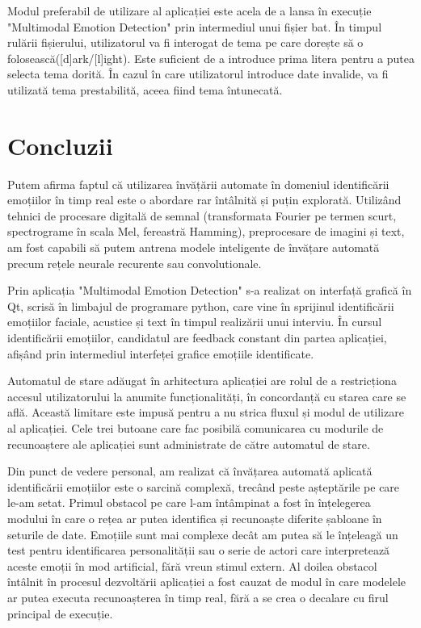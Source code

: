 \documentclass[a4paper, 12pt]{report}
\begin{document}
	Modul preferabil de utilizare al aplicației este acela de a lansa în execuție "Multimodal Emotion Detection" prin intermediul unui fișier bat. În timpul rulării fișierului, utilizatorul va fi interogat de tema pe care dorește să o folosească([d]ark/[l]ight). Este suficient de a introduce prima litera pentru a putea selecta tema dorită. În cazul în care utilizatorul introduce date invalide, va fi utilizată tema prestabilită, aceea fiind tema întunecată.

	\clearpage
	\section{Concluzii}
	Putem afirma faptul că utilizarea învățării automate în domeniul identificării emoțiilor în timp real este o abordare rar întâlnită și puțin explorată. Utilizând tehnici de procesare digitală de semnal (transformata Fourier pe termen scurt, spectrograme în scala Mel, fereastră Hamming), preprocesare de imagini și text, am fost capabili să putem antrena modele inteligente de învățare automată precum rețele neurale recurente sau convolutionale.

	Prin aplicația "Multimodal Emotion Detection" s-a realizat on interfață grafică în Qt, scrisă în limbajul de programare python, care vine în sprijinul identificării emoțiilor faciale, acustice și text în timpul realizării unui interviu. În cursul identificării emoțiilor, candidatul are feedback constant din partea aplicației, afișând prin intermediul interfeței grafice emoțiile identificate. 

	Automatul de stare adăugat în arhitectura aplicației are rolul de a restricționa accesul utilizatorului la anumite funcționalități, în concordanță cu starea care se află. Această limitare este impusă pentru a nu strica fluxul și modul de utilizare al aplicației. Cele trei butoane care fac posibilă comunicarea cu modurile de recunoaștere ale aplicației sunt administrate de către automatul de stare.

	Din punct de vedere personal, am realizat că învățarea automată aplicată identificării emoțiilor este o sarcină complexă, trecând peste așteptările pe care le-am setat. Primul obstacol pe care l-am întâmpinat a fost în înțelegerea modului în care o rețea ar putea identifica și recunoaște diferite șabloane în seturile de date. Emoțiile sunt mai complexe decât am putea să le înțeleagă un test pentru identificarea personalității sau o serie de actori care interpretează aceste emoții în mod artificial, fără vreun stimul extern. Al doilea obstacol întâlnit în procesul dezvoltării aplicației a fost cauzat de modul în care modelele ar putea executa recunoașterea în timp real, fără a se crea o decalare cu firul principal de execuție.
\end{document}
